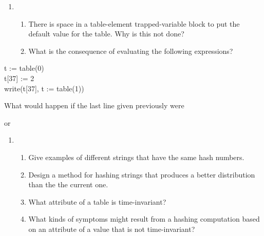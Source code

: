 \liststyleLix
\begin{enumerate}
\item \begin{enumerate}

\item There is space in a table-element trapped-variable block to put
the default value for the table. Why is this not done?

\item 
What is the consequence of evaluating the following expressions?
\end{enumerate}
\end{enumerate}
\begin{iconcode}
\>t := table(0)\\
\>t[37] := 2\\
\>write(t[37], t := table(1))
\end{iconcode}

What would happen if the last line given previously were


or


\liststyleLx
\begin{enumerate}
\item \begin{enumerate}

\item Give examples of different strings that have the same hash numbers.

\item Design a method for hashing strings that produces a better
distribution than the the current one.

\item What attribute of a table is time-invariant?

\item What kinds of symptoms might result from a hashing computation
 based on an attribute of a value that is not time-invariant?

\end{enumerate}
\end{enumerate}
